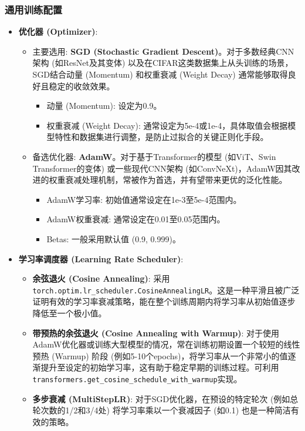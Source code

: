 \documentclass[a4paper]{article}
\begin{document}
\begin{description}
\subsubsection{通用训练配置}
\begin{itemize}
    \item \textbf{优化器 (Optimizer)}:
    \begin{itemize}
        \item 主要选用: \textbf{SGD (Stochastic Gradient Descent)}。对于多数经典CNN架构 (如ResNet及其变体) 以及在CIFAR这类数据集上从头训练的场景，SGD结合动量 (Momentum) 和权重衰减 (Weight Decay) 通常能够取得良好且稳定的收敛效果。
        \begin{itemize}
            \item 动量 (Momentum): 设定为0.9。
            \item 权重衰减 (Weight Decay): 通常设定为5e-4或1e-4，具体取值会根据模型特性和数据集进行调整，是防止过拟合的关键正则化手段。
        \end{itemize}
        \item 备选优化器: \textbf{AdamW}。对于基于Transformer的模型 (如ViT、Swin Transformer的变体) 或一些现代CNN架构 (如ConvNeXt)，AdamW因其改进的权重衰减处理机制，常被作为首选，并有望带来更优的泛化性能。
        \begin{itemize}
            \item AdamW学习率: 初始值通常设定在1e-3至5e-4范围内。
            \item AdamW权重衰减: 通常设定在0.01至0.05范围内。
            \item Betas: 一般采用默认值 (0.9, 0.999)。
        \end{itemize}
    \end{itemize}
    \item \textbf{学习率调度器 (Learning Rate Scheduler)}:
    \begin{itemize}
        \item \textbf{余弦退火 (Cosine Annealing)}: 采用\texttt{torch.optim.lr\_scheduler.CosineAnnealingLR}。这是一种平滑且被广泛证明有效的学习率衰减策略，能在整个训练周期内将学习率从初始值逐步降低至一个极小值。
        \item \textbf{带预热的余弦退火 (Cosine Annealing with Warmup)}: 对于使用AdamW优化器或训练大型模型的情况，常在训练初期设置一个较短的线性预热 (Warmup) 阶段 (例如5-10个epochs)，将学习率从一个非常小的值逐渐提升至设定的初始学习率，这有助于稳定早期的训练过程。可利用\texttt{transformers.get\_cosine\_schedule\_with\_warmup}实现。
        \item \textbf{多步衰减 (MultiStepLR)}: 对于SGD优化器，在预设的特定轮次 (例如总轮次数的1/2和3/4处) 将学习率乘以一个衰减因子 (如0.1) 也是一种简洁有效的策略。

\end{itemize}
\end{itemize}
\end{description}
\end{document}
